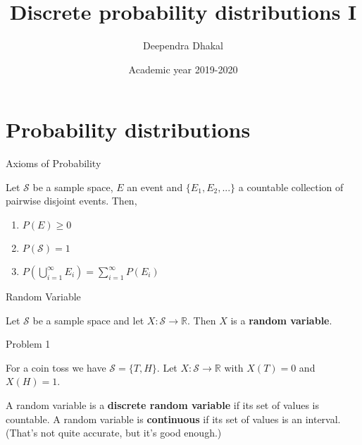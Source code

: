 \documentclass[ignorenonframetext,aspectratio=169]{beamer}
\title{Discrete probability distributions I}
\author{Deependra Dhakal}
\institute{\url{https://rookie.rbind.io}}
\date{Academic year 2019-2020}
\providecommand{\tightlist}{%
  \setlength{\itemsep}{0pt}\setlength{\parskip}{0pt}}
\begin{document}
\frame{\titlepage}

\begin{frame}
\tableofcontents[hideallsubsections]
\end{frame}
\hypertarget{probability-distributions}{%
\section{Probability distributions}\label{probability-distributions}}


\begin{frame}{Axioms of Probability}
\protect\hypertarget{axioms-of-probability}{}

Let \(\mathcal{S}\) be a sample space, \(E\) an event and
\(\{E_1, E_2, ... \}\) a countable collection of pairwise disjoint
events. Then,

\begin{enumerate}
\tightlist
\item
  \(P(E)\geq 0\)
\item
  \(P(\mathcal{S})=1\)
\item
  \(P\left(\bigcup\limits_{i=1}^{\infty} E_{i}\right) = \sum\limits_{i=1}^{\infty} P(E_i)\)
\end{enumerate}

\end{frame}

\begin{frame}{Random Variable}
\protect\hypertarget{random-variable}{}

Let \(\mathcal{S}\) be a sample space and let
\(X:\mathcal{S}\rightarrow\mathbb{R}\). Then \(X\) is a \textbf{random
variable}.

\end{frame}

\begin{frame}{Problem 1}
\protect\hypertarget{problem-1}{}

For a coin toss we have \(\mathcal{S}=\{T, H\}\). Let
\(X:\mathcal{S}\rightarrow\mathbb{R}\) with \(X(T)=0\) and \(X(H)=1\).

A random variable is a \textbf{discrete random variable} if its set of
values is countable. A random variable is \textbf{continuous} if its set
of values is an interval. (That's not quite accurate, but it's good
enough.)

\end{frame}
\end{document}
